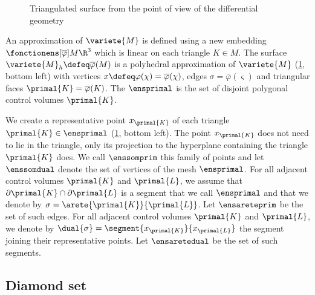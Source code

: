 \begin{figure}[p]
    \centering
    
    \caption{Triangulated surface from the point of view of the differential geometry}
    \label{fig:ddfv_3d}
\end{figure}

An approximation of $\variete{M}$ is defined using a new embedding $\fonctionens[\overline{\varphi}]{M}{\R^3}$ which is linear on each triangle $K \in M$. The surface $\variete{M}_h \defeq \overline{\varphi}(M)$ is a polyhedral approximation of $\variete{M}$ (\ref{fig:ddfv_3d}, bottom left) with vertices $x \defeq \varphi(\chi) = \overline{\varphi}(\chi)$, edges $\sigma = \overline{\varphi}(\varsigma)$ and triangular faces $\primal{K} = \overline{\varphi}(K)$. The  $\ensprimal$ is the set of disjoint polygonal control volumes $\primal{K}$. 

We create a representative point $x_{\primal{K}}$  of each triangle $\primal{K} \in \ensprimal$ (\ref{fig:ddfv_3d}, bottom left). The point $x_{\primal{K}}$ does not need to lie in the triangle, only its projection to the hyperplane containing the triangle $\primal{K}$ does. We call $\enssomprim$ this family of points and let $\enssomdual$ denote the set of vertices of the mesh $\ensprimal$. For all adjacent control volumes $\primal{K}$ and $\primal{L}$, we assume that $\partial \primal{K} \cap \partial \primal{L}$ is a segment that we call  $\ensprimal$ and that we denote by $\sigma = \arete{\primal{K}}{\primal{L}}$. Let $\ensareteprim$ be the set of such edges. For all adjacent control volumes $\primal{K}$ and $\primal{L}$, we denote by $\dual{\sigma} = \segment{x_{\primal{K}}}{x_{\primal{L}}}$ the segment joining their representative points. Let $\ensaretedual$ be the set of such segments. 

\subsection{Diamond set}

